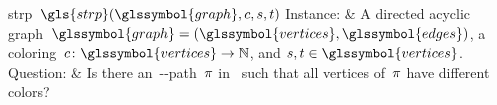 \begin{problem}[framed]{\acrlong{strp}~$\gls{strp}(
\glssymbol{graph},c,\source,\sink)$}
    Instance: & A directed acyclic graph~$\glssymbol{graph} =
    (\glssymbol{vertices},\glssymbol{edges})$, a
    coloring~$\col\colon\glssymbol{vertices}\to\naturals$, and $\source,
    \target\in\glssymbol{vertices}$.\\
    Question: & Is there an~\source-\target-path~$\pi$ in~
    such that all vertices of~$\pi$ have different colors?
\end{problem} 
